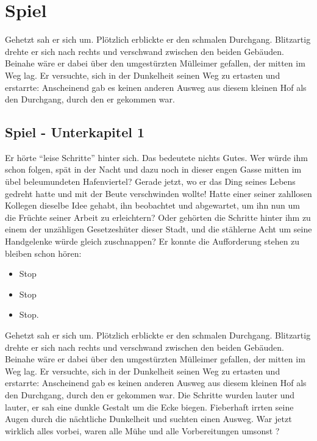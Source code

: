 
\chapter{Spiel}
\label{Spiel}
%
Gehetzt sah er sich um. Plötzlich erblickte er den schmalen
Durchgang. Blitzartig drehte er sich nach rechts und verschwand
zwischen den beiden Gebäuden. Beinahe wäre er dabei über den
umgestürzten Mülleimer gefallen, der mitten im Weg lag. Er
versuchte, sich in der Dunkelheit seinen Weg zu ertasten und
erstarrte: Anscheinend gab es keinen anderen Ausweg aus diesem
kleinen Hof als den Durchgang, durch den er gekommen war.


\section{Spiel - Unterkapitel 1}
\label{Spiel_-_Unterkapitel_1}
%
Er hörte \enquote{leise Schritte} hinter sich. Das bedeutete
nichts Gutes. Wer würde ihm schon folgen, spät in der Nacht und
dazu noch in dieser engen Gasse mitten im übel beleumundeten
Hafenviertel? Gerade jetzt, wo er das Ding seines Lebens gedreht
hatte und mit der Beute verschwinden wollte! Hatte einer seiner
zahllosen Kollegen dieselbe Idee gehabt, ihn beobachtet und
abgewartet, um ihn nun um die Früchte seiner Arbeit zu
erleichtern? Oder gehörten die Schritte hinter ihm zu einem der
unzähligen Gesetzeshüter dieser Stadt, und die stählerne Acht um
seine Handgelenke würde gleich zuschnappen? Er konnte die
Aufforderung stehen zu bleiben schon hören:

\begin{itemize}
  \item Stop
  \item Stop
  \item Stop.
\end{itemize}

Gehetzt sah er sich um. Plötzlich erblickte er den schmalen
Durchgang. Blitzartig drehte er sich nach rechts und verschwand
zwischen den beiden Gebäuden. Beinahe wäre er dabei über den
umgestürzten Mülleimer gefallen, der mitten im Weg lag. Er
versuchte, sich in der Dunkelheit seinen Weg zu ertasten und
erstarrte: Anscheinend gab es keinen anderen Ausweg aus diesem
kleinen Hof als den Durchgang, durch den er gekommen war. Die
Schritte wurden lauter und lauter, er sah eine dunkle Gestalt um
die Ecke biegen. Fieberhaft irrten seine Augen durch die
nächtliche Dunkelheit und suchten einen Ausweg. War jetzt wirklich
alles vorbei, waren alle Mühe und alle Vorbereitungen umsonst \cite{Abramowski:1991}?



